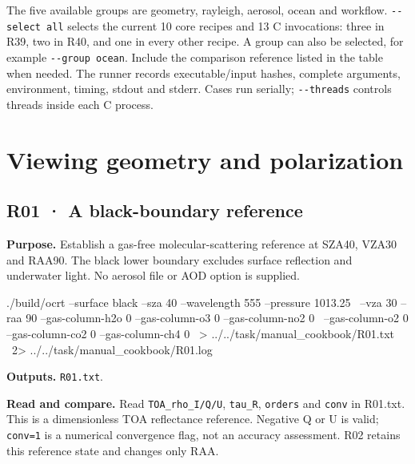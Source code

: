 The five available groups are geometry, rayleigh, aerosol, ocean and workflow. \texttt{-\allowbreak{}-\allowbreak{}select all} selects the current 10 core recipes and 13 C invocations: three in R39, two in R40, and one in every other recipe. A group can also be selected, for example \texttt{-\allowbreak{}-\allowbreak{}group ocean}. Include the comparison reference listed in the table when needed. The runner records executable/input hashes, complete arguments, environment, timing, stdout and stderr. Cases run serially; \texttt{-\allowbreak{}-\allowbreak{}threads} controls threads inside each C process.

\clearpage

\section{Viewing geometry and polarization}

\label{sec:auto:09_cookbook:2}

\label{sec:cookbook_group:geometry}

\subsection{R01 · A black-boundary reference}
\label{sec:auto:09_cookbook:2.1}

\label{recipe:R01}

\textbf{Purpose. }Establish a gas-free molecular-scattering reference at SZA40\textdegree{}, VZA30\textdegree{} and RAA90\textdegree{}. The black lower boundary excludes surface reflection and underwater light. No aerosol file or AOD option is supplied.

\noindent\begin{minipage}{\linewidth}
\begin{ManualCode}

./build/ocrt --surface black --sza 40 --wavelength 555 --pressure 1013.25 \
  --vza 30 --raa 90 --gas-column-h2o 0 --gas-column-o3 0 --gas-column-no2 0 \
  --gas-column-o2 0 --gas-column-co2 0 --gas-column-ch4 0 \
  > ../../task/manual_cookbook/R01.txt \
  2> ../../task/manual_cookbook/R01.log

\end{ManualCode}
\end{minipage}\par

\textbf{Outputs. }\texttt{R01.txt}.

\textbf{Read and compare. }Read \texttt{TOA\_\allowbreak{}rho\_\allowbreak{}I/\allowbreak{}Q/\allowbreak{}U}, \texttt{tau\_\allowbreak{}R}, \texttt{orders} and \texttt{conv} in R01.txt. This is a dimensionless TOA reflectance reference. Negative Q or U is valid; \texttt{conv=\allowbreak{}1} is a numerical convergence flag, not an accuracy assessment. R02 retains this reference state and changes only RAA.

